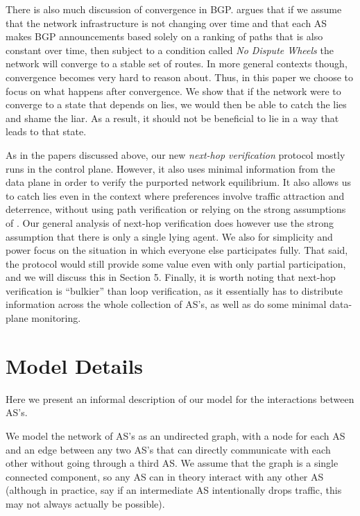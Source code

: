 \documentclass[10pt]{article}
\begin{document}
There is also much discussion of convergence in BGP. \cite{RoutingGames} argues that if we assume that the network infrastructure is not changing over time and that each AS makes BGP announcements based solely on a ranking of paths that is also constant over time, then subject to a condition called \emph{No Dispute Wheels} the network will converge to a stable set of routes. In more general contexts though, convergence becomes very hard to reason about. Thus, in this paper we choose to focus on what happens after convergence. We show that if the network were to converge to a state that depends on lies, we would then be able to catch the lies and shame the liar. As a result, it should not be beneficial to lie in a way that leads to that state.

As in the papers discussed above, our new \emph{next-hop verification} protocol mostly runs in the control plane. However, it also uses minimal information from the data plane in order to verify the purported network equilibrium. It also allows us to catch lies even in the context where preferences involve traffic attraction and deterrence, without using path verification or relying on the strong assumptions of \cite{Attraction}. Our general analysis of next-hop verification does however use the strong assumption that there is only a single lying agent. We also for simplicity and power focus on the situation in which everyone else participates fully. That said, the protocol would still provide some value even with only partial participation, and we will discuss this in Section 5. Finally, it is worth noting that next-hop verification is ``bulkier'' than loop verification, as it essentially has to distribute information across the whole collection of AS's, as well as do some minimal data-plane monitoring.


\section{Model Details}
Here we present an informal description of our model for the interactions between AS's.

We model the network of AS's as an undirected graph, with a node for each AS and an edge between any two AS's that can directly communicate with each other without going through a third AS. We assume that the graph is a single connected component, so any AS can in theory interact with any other AS (although in practice, say if an intermediate AS intentionally drops traffic, this may not always actually be possible).
\end{document}
